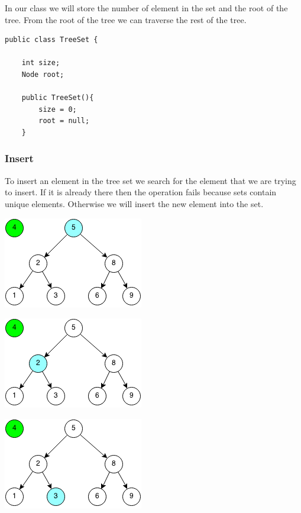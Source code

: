 \documentclass[11pt,oneside]{book}
\makeatletter
\def\maxwidth#1{\ifdim\Gin@nat@width>#1 #1\else\Gin@nat@width\fi}
\makeatother
\begin{document}
In our class we will store the number of element in the set and the root of the tree. From the root of the tree we can traverse the rest of the tree.

\begin{lstlisting}
public class TreeSet {

    int size;
    Node root;
    
    public TreeSet(){
        size = 0;
        root = null;
    }
\end{lstlisting}

\subsubsection{Insert}

To insert an element in the tree set we search for the element that we are trying to insert. If it is already there then the operation fails because sets contain unique elements. Otherwise we will insert the new element into the set.

\includegraphics[width=\maxwidth{\textwidth}]{bstinsert.png}

\includegraphics[width=\maxwidth{\textwidth}]{bstinsert2.png}

\includegraphics[width=\maxwidth{\textwidth}]{bstinsert3.png}
\end{document}
